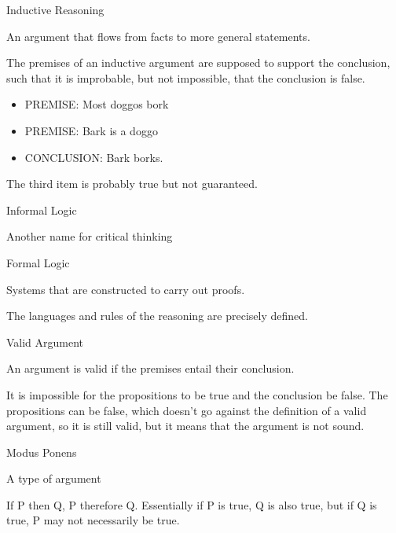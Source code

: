 \documentclass[]{../../DefinitionFormat}
\begin{document}
\begin{definition}{Inductive Reasoning}
	\begin{summary}
		An argument that flows from facts to more general statements. 
	\end{summary}
	
	\par The premises of an inductive argument are supposed to support the conclusion, such that it is improbable, but not impossible, that the conclusion is false.
	\begin{itemize}[label={}]
		\item PREMISE: Most doggos bork
		\item PREMISE: Bark is a doggo
		\item CONCLUSION: Bark borks.
	\end{itemize}
	\par The third item is probably true but not guaranteed.
\end{definition}

\begin{definition}{Informal Logic}
	\begin{summary}
		Another name for critical thinking	
	\end{summary}
\end{definition}

\begin{definition}{Formal Logic}
	\begin{summary}
		Systems that are constructed to carry out proofs.
	\end{summary}
	
	\par The languages and rules of the reasoning are precisely defined.
\end{definition}

\begin{definition}{Valid Argument}
	\begin{summary}
		An argument is valid if the premises entail their conclusion.
	\end{summary}
	
	\par It is impossible for the propositions to be true and the conclusion be false. The propositions can be false, which doesn't go against the definition of a valid argument, so it is still valid, but it means that the argument is not sound.
\end{definition}

\begin{definition}{Modus Ponens}
	\begin{summary}
		A type of argument
	\end{summary}
	
	\par If P then Q, P therefore Q. Essentially if P is true, Q is also true, but if Q is true, P may not necessarily be true.
\end{definition}
\end{document}

